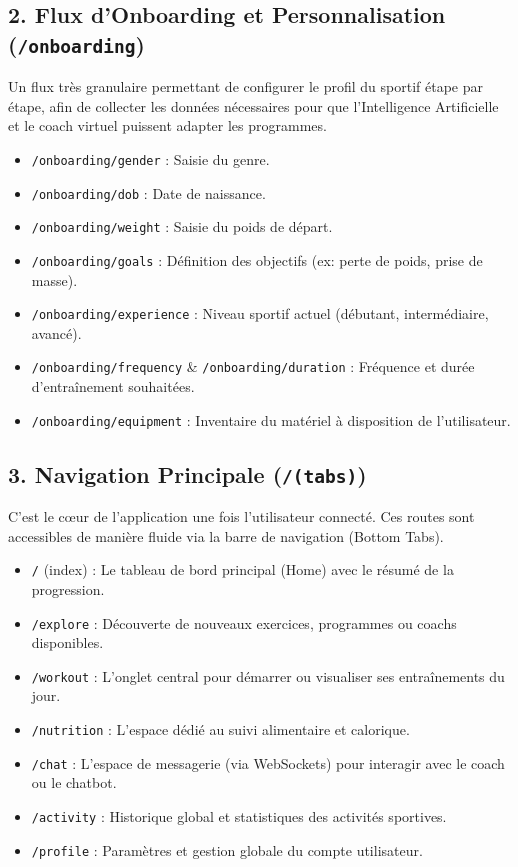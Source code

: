 \subsection{2. Flux d'Onboarding et Personnalisation (\texttt{/onboarding})}
Un flux très granulaire permettant de configurer le profil du sportif étape par étape, afin de collecter les données nécessaires pour que l'Intelligence Artificielle et le coach virtuel puissent adapter les programmes.
\begin{itemize}
    \item \texttt{/onboarding/gender} : Saisie du genre.
    \item \texttt{/onboarding/dob} : Date de naissance.
    \item \texttt{/onboarding/weight} : Saisie du poids de départ.
    \item \texttt{/onboarding/goals} : Définition des objectifs (ex: perte de poids, prise de masse).
    \item \texttt{/onboarding/experience} : Niveau sportif actuel (débutant, intermédiaire, avancé).
    \item \texttt{/onboarding/frequency} \& \texttt{/onboarding/duration} : Fréquence et durée d'entraînement souhaitées.
    \item \texttt{/onboarding/equipment} : Inventaire du matériel à disposition de l'utilisateur.
\end{itemize}

\subsection{3. Navigation Principale (\texttt{/(tabs)})}
C'est le cœur de l'application une fois l'utilisateur connecté. Ces routes sont accessibles de manière fluide via la barre de navigation (Bottom Tabs).
\begin{itemize}
    \item \texttt{/} (index) : Le tableau de bord principal (Home) avec le résumé de la progression.
    \item \texttt{/explore} : Découverte de nouveaux exercices, programmes ou coachs disponibles.
    \item \texttt{/workout} : L'onglet central pour démarrer ou visualiser ses entraînements du jour.
    \item \texttt{/nutrition} : L'espace dédié au suivi alimentaire et calorique.
    \item \texttt{/chat} : L'espace de messagerie (via WebSockets) pour interagir avec le coach ou le chatbot.
    \item \texttt{/activity} : Historique global et statistiques des activités sportives.
    \item \texttt{/profile} : Paramètres et gestion globale du compte utilisateur.
\end{itemize}

